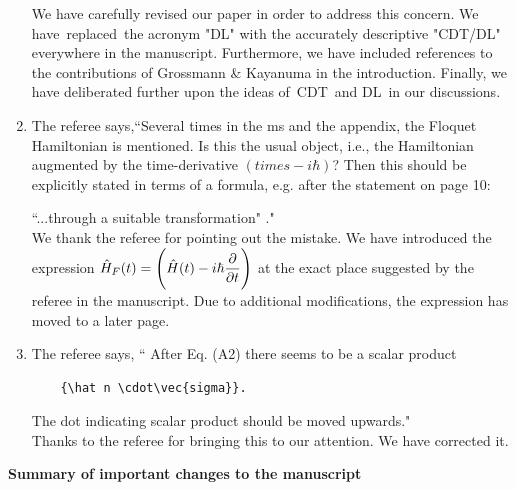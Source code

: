 \documentclass[aps,prb,reprint,showpacs,floatfix,superscriptaddress, onecolumn, nofootinbib, 9pt]{revtex4-2}
\newcommand{\ar}[1]{{\color{blue}#1}} %
\begin{document}
\begin{enumerate}
{   We have carefully revised our paper in order to address this concern. We have replaced the acronym "DL" with the accurately descriptive "CDT/DL" everywhere in the manuscript. Furthermore,  we have included references to the contributions of Grossmann \& Kayanuma in the introduction. Finally, we have deliberated further upon the  ideas of CDT and DL in our discussions.
    }

    \item The referee says,``Several times in the ms and the appendix, the Floquet Hamiltonian is mentioned. Is this the usual object, i.e., the Hamiltonian augmented by the time-derivative $(times -i\hbar)$? Then this should be explicitly stated in terms of a formula, e.g. after the statement on page 10:

    ``...through a suitable transformation" ."\\

    \ar{
    We thank the referee for pointing out the mistake. We have introduced the expression $\displaystyle \hat{H}_F(t) = \Bigg(\hat{H}(t) - i\hbar \pdv{t}\Bigg)$ at the exact place suggested by the referee in the manuscript. Due to additional modifications, the expression has moved to a later page.
    }
    \item The referee says, `` After Eq. (A2) there seems to be a scalar product \begin{verbatim}
    {\hat n \cdot\vec{sigma}}.
    \end{verbatim} The dot indicating scalar product should be moved upwards."\\

    \ar{
    Thanks to the referee for bringing this to our attention. We have corrected it.
    }
\end{enumerate}
\vskip 1cm 
\noindent \textbf{Summary of important changes to the  manuscript}
\end{document}
